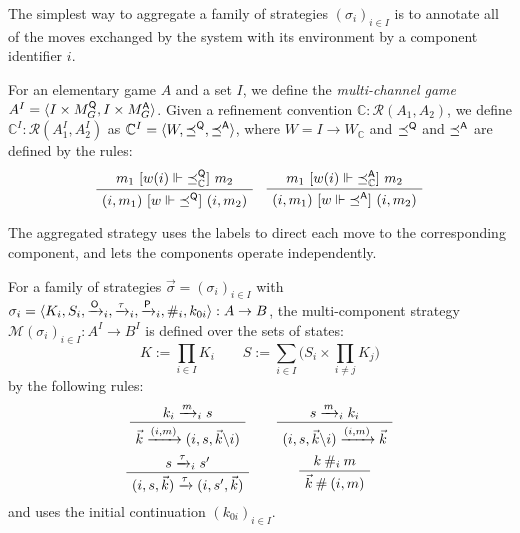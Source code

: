 The simplest way to aggregate a family of strategies $(\sigma_i)_{i\in I}$
is to annotate all of the moves exchanged by the system with its environment
by a component identifier $i$.

\begin{definition}
For an elementary game $A$ and a set $I$,
we define the \emph{multi-channel game}
$A^I = \langle I \times M_G^{ \mathsf{Q} }, I \times M_G^{ \mathsf{A} } \rangle$.
Given a refinement convention
$\mathbb{C} : \mathcal{R}(A_1, A_2)$,
we define
$\mathbb{C}^I : \mathcal{R}(A_1^I, A_2^I)$
as
$\mathbb{C}^I =
 \langle W, {\preceq}^{ \mathsf{Q} }, {\preceq}^{ \mathsf{A} } \rangle$,
where
$W = I \rightarrow W_\mathbb{C}$ and
$\preceq^{ \mathsf{Q} }$ and $\preceq^{ \mathsf{A} }$
are defined by the rules:
\[
    \AxiomC{$m_1 \ifr{w(i) \Vdash {\preceq}_\mathbb{C}^\kw{Q}} m_2$}
    \UnaryInfC{$(i, m_1) \ifr{w \Vdash {\preceq}^\kw{Q}} (i, m_2)$}
    \DisplayProof
    \quad
    \AxiomC{$m_1 \ifr{w(i) \Vdash {\preceq}_\mathbb{C}^\kw{A}} m_2$}
    \UnaryInfC{$(i, m_1) \ifr{w \Vdash {\preceq}^\kw{A}} (i, m_2)$}
    \DisplayProof
\]
\end{definition}

The aggregated strategy uses the labels to direct each move
to the corresponding component,
and lets the components operate independently.

\begin{definition}
For a family of strategies
$\vec{\sigma} = (\sigma_i)_{i \in I}$
with
$\sigma_i = \langle K_i, S_i, \xrightarrow{ \mathsf{O} }_i,
  \xrightarrow{\tau}_i, \xrightarrow{ \mathsf{P} }_i, \#_i, k_{0i} \rangle :
  A \rightarrow B$,
the multi-component strategy
$\mathcal{M}(\sigma_i)_{i \in I} : A^I \rightarrow B^I$
is defined over the sets of states:
\[
  K := \prod_{i \in I} K_i \qquad
  S := \sum_{i \in I}
    \Big( S_i \times \prod_{i \ne j} K_j \Big)
\]
by the following rules:
\[
  \begin{array}{c@{\qquad}c}
    \AxiomC{$k_i \xrightarrow{m}_i s$}
    \UnaryInfC{$\vec{k} \xrightarrow{(i, m)} (i, s, \vec{k} \backslash i)$}
    \DisplayProof
    &
    \AxiomC{$s \xrightarrow{m}_i k_i$}
    \UnaryInfC{$(i, s, \vec{k} \backslash i) \xrightarrow{(i, m)} \vec{k}$}
    \DisplayProof
    \\[1.5em]
    \AxiomC{$s \xrightarrow{\tau}_i s'$}
    \UnaryInfC{$(i, s, \vec{k}) \xrightarrow{\tau} (i, s', \vec{k})$}
    \DisplayProof
    &
    \AxiomC{$k \: \#_i \: m$}
    \UnaryInfC{$\vec{k} \: \# \: (i, m)$}
    \DisplayProof
  \end{array}
\]
and uses the initial continuation $(k_{0i})_{i \in I}$.
\end{definition}

